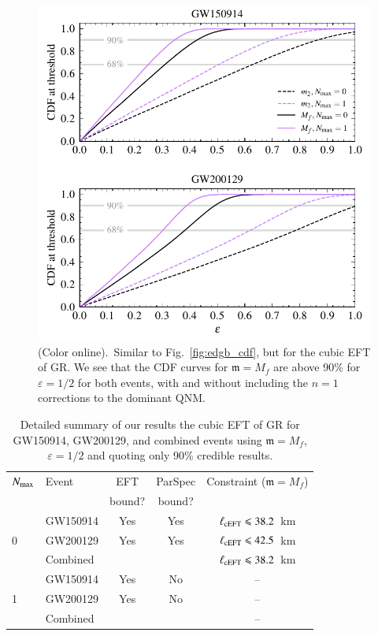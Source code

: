 \documentclass[twocolumn,
               prd,
               aps,
               superscriptaddress,
               tightenlines,
               nofootinbib,
               eqsecnum,
               amsfonts,
               amsmath,
               longbibliography]{revtex4-1}
\newcommand{\gm}{\mathfrak{m}}
\begin{document}
\begin{figure}[t]
\includegraphics[width=\columnwidth]{figs/ceft_cdf_varying_threshold.pdf}
\caption{(Color online).~Similar to Fig.~\ref{fig:edgb_cdf}, but for the cubic EFT of GR.
We see that the CDF curves for $\gm = M_{f}$ are above 90\% for $\varepsilon =
1/2$ for both events, with and without including the $n = 1$ corrections to
the dominant QNM.
}
\label{fig:cEFT_cdf}
\end{figure}

\begin{table}[b]
\begin{tabular}{l l c c c}
\hline
\hline
$N_{\rm max}$ & Event & EFT    & ParSpec & Constraint ($\gm = M_{f}$) \\
              &       & bound? & bound?  &                            \\
\hline
  & GW150914  & Yes & Yes &  $\ell_{\rm cEFT} \leqslant 38.2$~km \\
0 & GW200129  & Yes & Yes &  $\ell_{\rm cEFT} \leqslant 42.5$~km \\
  & Combined  &     &     &  \cellcolor{black!10}$\ell_{\rm cEFT} \leqslant 38.2$~km \\
\hline
  & GW150914  & Yes  & No  &  -- \\
1 & GW200129  & Yes  & No  &  -- \\
  & Combined  &      &     &  -- \\
\hline
\hline
\end{tabular}
\caption{Detailed summary of our results the cubic EFT of GR for GW150914, GW200129, and
combined events using $\gm = M_{f}$, $\varepsilon = 1/2$ and quoting only 90\% credible results.
}
\label{tab:summary_ceft}
\end{table}
\end{document}
